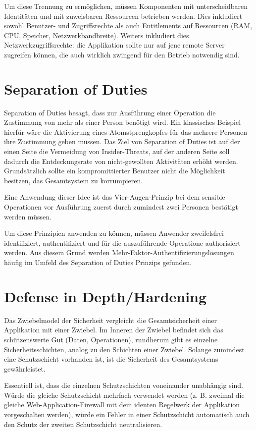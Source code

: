 Um diese Trennung zu ermöglichen, müssen Komponenten mit unterscheidbaren Identitäten und mit zuweisbaren Ressourcen betrieben werden. Dies inkludiert sowohl Benutzer- und Zugriffsrechte als auch Entitlements auf Ressourcen (RAM, CPU, Speicher, Netzwerkbandbreite). Weiters inkludiert dies Netzwerkzugriffsrechte: die Applikation sollte nur auf jene remote Server zugreifen können, die auch wirklich zwingend für den Betrieb notwendig sind.

\section{Separation of Duties}

Separation of Duties besagt, dass zur Ausführung einer Operation die Zustimmung von mehr als einer Person benötigt wird. Ein klassisches Beispiel hierfür wäre die Aktivierung eines Atomstprengkopfes für das mehrere Personen ihre Zustimmung geben müssen. Das Ziel von Separation of Duties ist auf der einen Seite die Vermeidung von Insider-Threats, auf der anderen Seite soll dadurch die Entdeckungsrate von nicht-gewollten Aktivitäten erhöht werden. Grundsätzlich sollte ein kompromittierter Benutzer nicht die Möglichkeit besitzen, das Gesamtsystem zu korrumpieren.

Eine Anwendung dieser Idee ist das Vier-Augen-Prinzip bei dem sensible Operationen vor Ausführung zuerst durch zumindest zwei Personen bestätigt werden müssen.

Um diese Prinzipien anwenden zu können, müssen Anwender zweifelsfrei identifiziert, authentifiziert und für die auszuführende Operatione authorisiert werden. Aus diesem Grund werden Mehr-Faktor-Authentifizierungslösungen häufig im Umfeld des Separation of Duties Prinzips gefunden.

\section{Defense in Depth/Hardening}

Das Zwiebelmodel der Sicherheit vergleicht die Gesamtsicherheit einer Applikation mit einer Zwiebel. Im Inneren der Zwiebel befindet sich das schützenswerte Gut (Daten, Operationen), rundherum gibt es einzelne Sicherheitsschichten, analog zu den Schichten einer Zwiebel. Solange zumindest eine Schutzschicht vorhanden ist, ist die Sicherheit des Gesamtsystems gewährleistet.

Essentiell ist, dass die einzelnen Schutzschichten voneinander unabhängig sind. Würde die gleiche Schutzschicht mehrfach verwendet werden (z. B. zweimal die gleiche Web-Application-Firewall mit dem identen Regelwerk der Applikation vorgeschalten werden), würde ein Fehler in einer Schutzschicht automatisch auch den Schutz der zweiten Schutzschicht neutralisieren.


